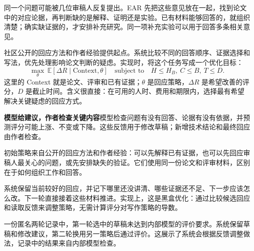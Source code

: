 
同一个问题可能被几位审稿人反复提出。EAR 先把这些意见放在一起，找到论文中的对应论据，再判断缺的是解释、证明还是实验。已有材料能够回答的，就组织清楚；确实缺证据的，才安排补充研究。同一项补充实验可以用于回答多条相关意见。

社区公开的回应方法和作者经验提供起点。系统比较不同的回答顺序、证据选择和写法，优先处理影响论文判断的疑虑。实现时，将这个任务写成一个优化目标：
\[
\max_{\theta}\ \mathbb E[\Delta R\mid\mathrm{Context},\theta]
\quad\text{subject to}\quad H\le H_B,\ C\le B,\ T\le D.
\]
这里的 Context 就是论文、评审和已有证据；$\theta$ 是回应策略，$\Delta R$ 是希望改善的评分，$D$ 是截止时间。含义很直接：在可用的人时、费用和期限内，选择最有希望解决关键疑虑的回应方式。

\begin{insight}
\textbf{模型给建议，作者检查关键内容}\quad 模型检查问题有没有回答、论据有没有依据，并预测评分可能上涨、不变或下降。这些反馈用于修改草稿；新增技术结论和最终回应由作者检查。
\end{insight}


初始策略来自公开的回应方法和作者经验：可以先解释已有证据，也可以先回应审稿人最关心的问题，或先安排缺失的验证。它们使用同一份论文和评审材料，区别在于如何组织工作和回答。

系统保留当前较好的回应，并记下哪里还没讲清、哪些证据还不足、下一步应该怎么改。下一轮直接接着这些材料推进。实现上，这是黑盒优化：通过比较候选回应和读取反馈来调整策略，无需计算评分对写作策略的导数。

一份匿名两轮记录中，第一轮选中的草稿未达到内部模型的评价要求。系统保留草稿和修改建议，第二轮换用另一策略后通过评价。这展示了系统会根据反馈调整做法，记录中的结果来自内部模型检查。

